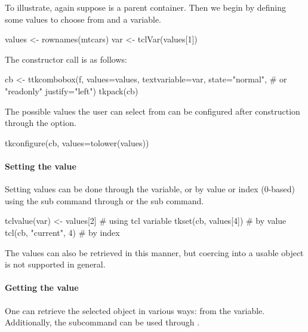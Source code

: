 To illustrate, again suppose  is a parent container. Then we
begin by defining some values to choose from and a \TCL\/ variable.


\begin{Schunk}
\begin{Sinput}
 values <- rownames(mtcars)
 var <- tclVar(values[1])
\end{Sinput}
\end{Schunk}

The constructor call is as follows:
\begin{Schunk}
\begin{Sinput}
 cb <- ttkcombobox(f,
                   values=values,
                   textvariable=var,
                   state="normal", # or "readonly"
                   justify="left")
 tkpack(cb)
\end{Sinput}
\end{Schunk}


The possible values the user can select from can be configured after
construction through the  option.
\begin{Schunk}
\begin{Sinput}
 tkconfigure(cb, values=tolower(values))
\end{Sinput}
\end{Schunk}


\paragraph{Setting the value}
Setting values can be done through the \TCL\/ variable, or by value or index (0-based) using the  sub command through  or the  sub command.

\begin{Schunk}
\begin{Sinput}
 tclvalue(var) <- values[2]            # using tcl variable
 tkset(cb, values[4])                  # by value
 tcl(cb, "current", 4)                 # by index
\end{Sinput}
\end{Schunk}
The values can also be retrieved in this manner, but coercing into a usable \R\/ object is not supported in general.

\paragraph{Getting the value}
One can retrieve the selected object in various ways: from the \TCL\/ variable. Additionally, the  subcommand can be used through .

